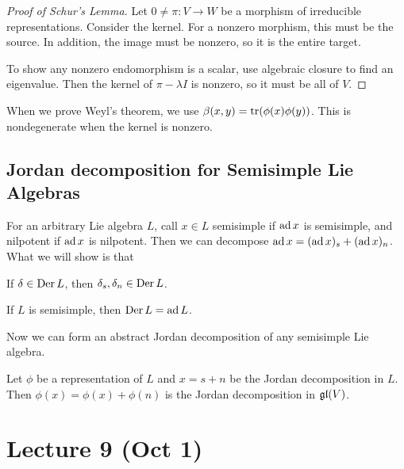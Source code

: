 \documentclass[twoside, 10pt]{article}
\begin{document}
    \begin{proof}[Proof of Schur's Lemma]
        Let $0 \neq \pi:V \to W$ be a morphism of irreducible representations. Consider the kernel. For a nonzero morphism, this must be the source. In addition, the image must be nonzero, so it is the entire target.

        To show any nonzero endomorphism is a scalar, use algebraic closure to find an eigenvalue. Then the kernel of $\pi - \lambda I$ is nonzero, so it must be all of $V$.
    \end{proof}

    \begin{rmk}
        When we prove Weyl's theorem, we use $\beta(x,y) = \operatorname{tr}(\phi(x)\phi(y))$. This is nondegenerate when the kernel is nonzero.
    \end{rmk}

    \subsection{Jordan decomposition for Semisimple Lie Algebras}%
    \label{sub:jordan_decomposition_for_semisimple_lie_algebras}
    
    For an arbitrary Lie algebra $L$, call $x \in L$ semisimple if $\operatorname{ad} x$ is semisimple, and nilpotent if $\operatorname{ad} x$ is nilpotent. Then we can decompose $\operatorname{ad} x = (\operatorname{ad} x)_s + (\operatorname{ad} x)_n$. What we will show is that 

    \begin{lem}
        If $\delta \in \operatorname{Der} L$, then $\delta_s, \delta_n \in \operatorname{Der} L$.
    \end{lem}

    \begin{lem}
        If $L$ is semisimple, then $\operatorname{Der} L = \operatorname{ad} L$.
    \end{lem}

    Now we can form an abstract Jordan decomposition of any semisimple Lie algebra.

    \begin{thm}
        Let $\phi$ be a representation of $L$ and $x=s+n$ be the Jordan decomposition in $L$. Then $\phi(x) = \phi(x) + \phi(n)$ is the Jordan decomposition in $\mathfrak{gl}(V)$.
    \end{thm}

    \section{Lecture 9 (Oct 1)}%
    \label{sec:lecture_9}
    
\end{document}
